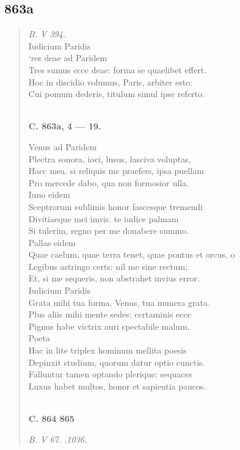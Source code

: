 \documentclass[11pt, a4paper]{report}
\begin{document}
            \subsection*{863a}
      \begin{verse}
      \textit{B. V 394.} \\  \lbrack Iudicium Paridis \rbrack  \\ ‘res deae ad Paridem \\ Tres sumus  \lbrack ecce \rbrack  deae: forma se quaelibet effert. \\ Hoc in discidio volumus, Paris, arbiter esto: \\ Cui pomum dederis, titulum simul ipse referto. \\ 
        ﻿\pagebreak 
    \begin{center} \textbf{C. 863a, 4 — 19.} \end{center} \marginpar{[314]} Venus ad Paridem \\ Plectra sonora, ioci, lusus, lasciva voluptas, \\ Haec mea. si reliquis me praefers, ipsa puellam \\ Pro mercede dabo, qua non formosior ulla. \\ Iuno eidem \\ Sceptrorum sublimis honor fascesque tremendi \\ Divitiaeque mei imris. te iudice palmam \\ Si tulerim, regno per me donabere summo. \\ Pallas eidem \\ Quae caelum, quae terra tenet, quae pontus et orcus, o \\ Legibus astringo certs: nil me sine rectum; \\ Et, si me sequeris, non abstrahet invius error. \\ Iudicium Paridis \\ Grata mihi tua forma, Venus, tua munera grata. \\ Plus aliis mihi mente sedes: certaminis ecce \\ Pignus habe victrix auri spectabile malum. \\ Poeta \\ Hac in lite triplex hominum mellita poesis \\ Depinxit studium, quorum datur optio cunctis. \\ Falluntur tamen optando plerique: sequaces \\ Luxus habet multos, honor et sapientia paucos. \\ 
        ﻿\pagebreak 
    \begin{center} \textbf{C. 864 865} \end{center} \marginpar{[315]} \textit{B. V 67. .1036.} \\ 
      \end{verse}
  
\end{document}
